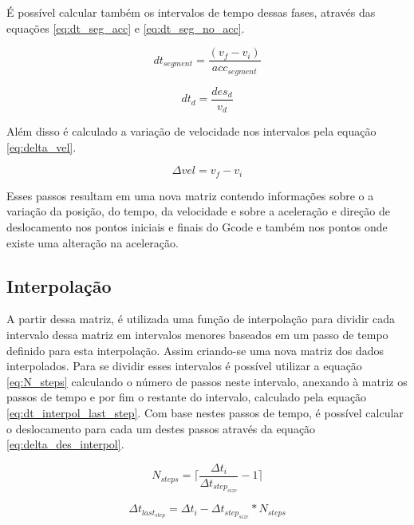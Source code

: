 É possível calcular também os intervalos de tempo dessas fases, através das 
equações \ref{eq:dt_seg_acc} e \ref{eq:dt_seg_no_acc}.

\begin{equation}
    \label{eq:dt_seg_acc}
    dt_{segment} = \frac{(v_f-v_i)}{acc_{segment}}
\end{equation}

\begin{equation}
    \label{eq:dt_seg_no_acc}
    dt_d = \frac{des_d}{v_d}
\end{equation}

Além disso é calculado a variação de velocidade nos intervalos pela equação \ref{eq:delta_vel}.

\begin{equation}
    \label{eq:delta_vel}
    \Delta vel = v_f-v_i
\end{equation}

Esses passos resultam em uma nova matriz contendo informações
sobre o a variação da posição, do tempo, da velocidade e sobre a aceleração e 
direção de deslocamento nos pontos iniciais e finais do Gcode e também nos pontos
onde existe uma alteração na aceleração.

\subsection{Interpolação}

A partir dessa matriz, é utilizada uma função de interpolação para dividir cada intervalo dessa matriz em intervalos menores
baseados em um passo de tempo definido para esta interpolação.
Assim criando-se uma nova matriz dos dados interpolados.
Para se dividir esses intervalos é possível utilizar a equação \ref{eq:N_steps}
calculando o número de passos neste intervalo, anexando à matriz os passos de tempo e por fim
o restante do intervalo, calculado pela equação \ref{eq:dt_interpol_last_step}.
Com base nestes passos de tempo, é possível calcular o deslocamento para cada um destes passos
através da equação \ref{eq:delta_des_interpol}.

\begin{equation}
    \label{eq:N_steps}
    N_{steps} = \lceil\frac{\Delta t_i}{\Delta t_{step_{size}}}-1\rceil
\end{equation}

\begin{equation}
    \label{eq:dt_interpol_last_step}
    \Delta t_{last_{step}}= \Delta t_i - \Delta t_{step_{size}}*N_{steps} 
\end{equation}

